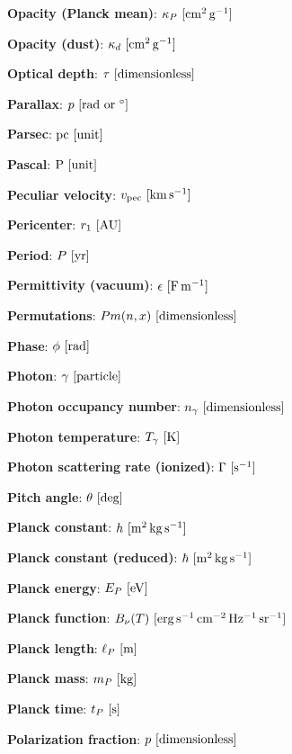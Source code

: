 \documentclass[a4paper,10pt]{article}
\begin{document}
{\noindent}\textbf{Opacity (Planck mean)}: $\kappa_P ~ [{\rm cm^2\,g^{-1}}]$

{\noindent}\textbf{Opacity (dust)}: $\kappa_d ~ [{\rm cm^2\,g^{-1}}]$

{\noindent}\textbf{Optical depth}: $\tau ~ [{\rm dimensionless}]$

{\noindent}\textbf{Parallax}: $p ~ [{\rm rad~or~^\circ}]$

{\noindent}\textbf{Parsec}: ${\rm pc} ~ [{\rm unit}]$

{\noindent}\textbf{Pascal}: ${\rm P} ~ [{\rm unit}]$

{\noindent}\textbf{Peculiar velocity}: $v_{\rm pec} ~ [{\rm km\,s^{-1}}]$

{\noindent}\textbf{Pericenter}: $r_1 ~ [{\rm AU}]$

{\noindent}\textbf{Period}: $P ~ [{\rm yr}]$

{\noindent}\textbf{Permittivity (vacuum)}: $\epsilon ~ [{\rm F\,m^{-1}}]$

{\noindent}\textbf{Permutations}: $Pm(n,x) ~ [{\rm dimensionless}]$

{\noindent}\textbf{Phase}: $\phi ~ [{\rm rad}]$

{\noindent}\textbf{Photon}: $\gamma ~ [{\rm particle}]$

{\noindent}\textbf{Photon occupancy number}: $n_\gamma ~ [{\rm dimensionless}]$

{\noindent}\textbf{Photon temperature}: $T_\gamma ~ [{\rm K}]$

{\noindent}\textbf{Photon scattering rate (ionized)}: $\Gamma ~ [{\rm s^{-1}}]$

{\noindent}\textbf{Pitch angle}: $\theta ~ [{\rm deg}]$

{\noindent}\textbf{Planck constant}: $h ~ [{\rm m^2\,kg\,s^{-1}}]$

{\noindent}\textbf{Planck constant (reduced)}: $\hbar ~ [{\rm m^2\,kg\,s^{-1}}]$

{\noindent}\textbf{Planck energy}: $E_P ~ [{\rm eV}]$

{\noindent}\textbf{Planck function}: $B_\nu(T) ~ [{\rm erg\,s^{-1}\,cm^{-2}\,Hz^{-1}\,sr^{-1}}]$

{\noindent}\textbf{Planck length}: $\ell_P ~ [{\rm m}]$

{\noindent}\textbf{Planck mass}: $m_P ~ [{\rm kg}]$

{\noindent}\textbf{Planck time}: $t_P ~ [{\rm s}]$

{\noindent}\textbf{Polarization fraction}: $p ~ [{\rm dimensionless}]$
\end{document}
